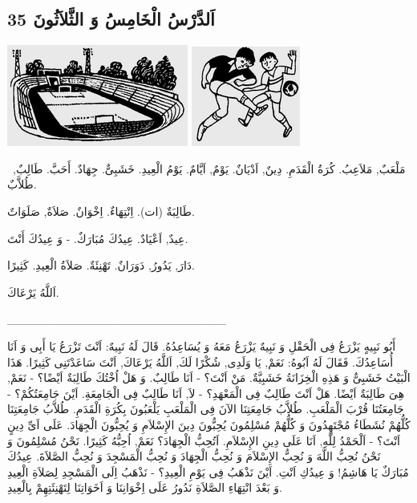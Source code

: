 \documentclass[a5paper]{article}
\begin{document}
\subsection{اَلدَّرْسُ الْخَامِسُ وَ الثَّلاَثُونَ 35}
 \includegraphics[width=2.3437in,height=1.3126in]{MuhammadBagauddinlatinized-img082.png}   \includegraphics[width=1.4063in,height=1.2917in]{MuhammadBagauddinlatinized-img083.png} 

\ مَلْعَبٌ, مَلاَعِبُ. كُرَةُ الْقَدَمِ. دِينٌ, اَدْيَانٌ. يَوْمٌ, اَيَّامٌ. يَوْمُ الْعِيدِ. خَشَبِىٌّ. جِهَادٌ. أَحَبَّ. طَالِبٌ, طُلاَّبٌ. 

طَالِبَةٌ (ات). اِنْتِهَاءٌ. اِخْوَانٌ. صَلاَةٌ, صَلَوَاتٌ. 

عِيدٌ, اَعْيَادٌ. عِيدُكَ مُبَارَكٌ. - وَ عِيدُكَ أَنْتَ. 

دَارَ, يَدُورُ, دَوَرَانٌ. تَهْنِئَةٌ. صَلاَةُ الْعِيدِ. كَثِيرًا.

اَللَّهُ يَرْعَاكَ.

\_\_\_\_\_\_\_\_\_\_\_\_\_\_\_\_\_\_\_\_\_\_\_\_\_\_

أَبُو نَبِيهٍ يَزْرَعُ فِى الْحَقْلِ وَ نَبِيهٌ يَزْرَعُ مَعَهُ وَ يُسَاعِدُهُ. قَالَ لَهُ نَبِيهٌ: اَنْتَ تَزْرَعُ يَا أَبِى وَ اَنَا أُسَاعِدُكَ. فَقَالَ لَهُ اَبُوهُ: نَعَمْ, يَا وَلَدِى, شُكْرًا لَكَ, اَللَّهُ يَرْعَاكَ, اَنْتَ سَاعَدْتَنِى كَثِيرًا. هَذَا الْبَيْتُ خَشَبِىٌّ وَ هَذِهِ الْخِزَانَةُ خَشَبِيَّةٌ. مَنْ اَنْتَ؟ - اَنَا طَالِبٌ. وَ هَلْ اُخْتُكَ طَالِبَةٌ اَيْضًا؟ - نَعَمْ, هِىَ طَالِبَةٌ اَيْضًا. هَلْ اَنْتَ طَالِبٌ فِى الْمَعْهَدِ؟ - لاَ, اَنَا طَالِبٌ فِى الْجَامِعَةِ. اَيْنَ جَامِعَتُكُمْ؟ - جَامِعَتُنَا قُرْبَ الْمَلْعَبِ. طُلاَّبُ جَامِعَتِنَا الآنَ فِى الْمَلْعَبِ يَلْعَبُونَ بِكُرَةِ الْقَدَمِ. طُلاَّبُ جَامِعَتِنَا كُلُّهُمْ نُشَطَاءُ مُجْتَهِدُونَ وَ كُلُّهُمْ مُسْلِمُونَ يُحِبُّونَ دِينَ الإِسْلاَمِ وَ يُحِبُّونَ الْجِهَادَ. عَلَى اَىِّ دِينٍ اَنْتَ؟ - اَلْحَمْدُ لِلَّهِ, اَنَا عَلَى دِينِ الإِسْلاَمِ. اَتُحِبُّ الْجِهَادَ؟ نَعَمْ, اُحِبُّهُ كَثِيرًا. نَحْنُ مُسْلِمُونَ وَ نَحْنُ نُحِبُّ اللَّهَ وَ نُحِبُّ الإِسْلاَمَ وَ نُحِبُّ الْجِهَادَ وَ نُحِبُّ الْمَسْجِدَ وَ نُحِبُّ الصَّلاَةَ. عِيدُكَ مُبَارَكٌ يَا هَاشِمُ! وَ عِيدُكِ اَنْتِ. اَيْنَ نَذْهَبُ فِى يَوْمِ الْعِيدِ؟ - نَذْهَبُ اِلَى الْمَسْجِدِ لِصَلاَةِ الْعِيدِ وَ بَعْدَ انْتِهَاءِ الصَّلاَةِ نَدُورُ عَلَى اِخْوَانِنَا وَ اَخَوَاتِنَا لِتَهْنِئَتِهِمْ بِالْعِيدِ.
\end{document}
